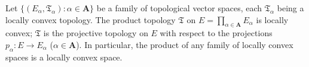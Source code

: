 Let $\{(E_\alpha, \mathfrak{T}_\alpha): \alpha \in \mathbf{A}\}$ be a family of topological vector spaces, each $\mathfrak{T}_\alpha$ being a locally convex topology. The product topology $\mathfrak{T}$ on $E = \prod_{\alpha \in \mathbf{A}} E_\alpha$ is locally convex; $\mathfrak{T}$ is the projective topology on $E$ with respect to the projections $p_\alpha \colon E \rightarrow E_\alpha$ ($\alpha \in \mathbf{A}$). In particular, the product of any family of locally convex spaces is a locally convex space.
